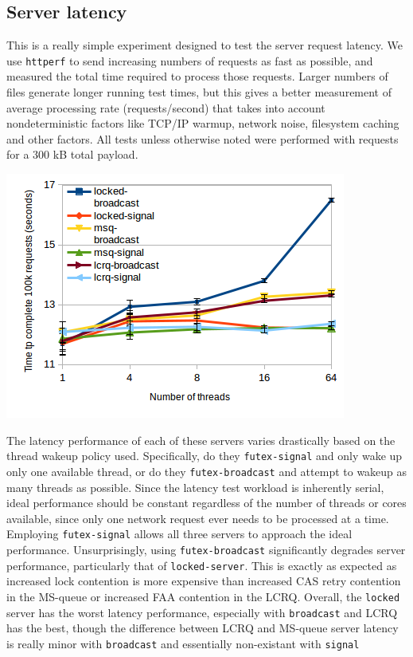 \documentclass[twoside,10pt]{article}
\newenvironment{Figure}
  {\par\medskip\noindent\minipage{\linewidth}}
  {\endminipage\par\medskip}
\begin{document}
\begin{multicols}{2}
\subsection{Server latency}

This is a really simple experiment designed to test the server request
latency. We use \verb+httperf+ to send increasing numbers of requests
as fast as possible, and measured the total time required to process
those requests. Larger numbers of files generate longer running test
times, but this gives a better measurement of average processing rate
(requests/second) that takes into account nondeterministic factors
like TCP/IP warmup, network noise, filesystem caching and other
factors. All tests unless otherwise noted were performed with requests
for a 300 kB total payload.

\begin{Figure}
\includegraphics[width=\linewidth]{img/latencynthreads2.png}
\end{Figure}

The latency performance of each of these servers varies drastically
based on the thread wakeup policy used. Specifically, do they
\verb+futex-signal+ and only wake up only one available thread, or do
they \verb+futex-broadcast+ and attempt to wakeup as many threads as
possible. Since the latency test workload is inherently serial, ideal
performance should be constant regardless of the number of threads or
cores available, since only one network request ever needs to be
processed at a time. Employing \verb+futex-signal+ allows all three
servers to approach the ideal performance. Unsurprisingly, using
\verb+futex-broadcast+ significantly degrades server performance,
particularly that of \verb+locked-server+. This is exactly as expected
as increased lock contention is more expensive than increased CAS
retry contention in the MS-queue or increased FAA contention in the
LCRQ. Overall, the \verb+locked+ server has the worst latency
performance, especially with \verb+broadcast+ and LCRQ has the best,
though the difference between LCRQ and MS-queue server latency is
really minor with \verb+broadcast+ and essentially non-existant with
\verb+signal+


\end{multicols}
\end{document}
